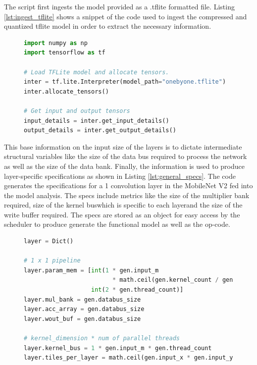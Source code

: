 \documentclass{uw-ece-wkrpt}
\begin{document}
The script first ingests the model provided as a .tflite formatted file. Listing \ref{lst:ingest_tflite} shows a snippet of the code used to ingest the compressed and quantized tflite model in order to extract the necessary information.

\begin{figure}
\centering
\begin{lstlisting}[caption={Code for ingesting a .tflite model}, label=lst:ingest_tflite, language=Python]
import numpy as np
import tensorflow as tf

# Load TFLite model and allocate tensors.
inter = tf.lite.Interpreter(model_path="onebyone.tflite")
inter.allocate_tensors()

# Get input and output tensors
input_details = inter.get_input_details()
output_details = inter.get_output_details()
\end{lstlisting}
\end{figure}

This base information on the input size of the layers is to dictate intermediate structural variables like the size of the data bus required to process the network as well as the size of the data bank. Finally, the information is used to produce layer-specific specifications as shown in Listing \ref{lst:general_specs}. The code generates the specifications for a 1  convolution layer in the MobileNet V2 fed into the model analysis. The specs include metrics like the size of the multiplier bank required, size of the \gls{kernel} bus\textemdash{}which is specific to each layer\textemdash{}and the size of the write buffer required. The specs are stored as an object for easy access by the scheduler to produce generate the functional model as well as the op-code.

\begin{figure}
\centering
\begin{lstlisting}[caption={Code for generating general specifications}, label=lst:general_specs, language=Python]
layer = Dict()

# 1 x 1 pipeline
layer.param_mem = [int(1 * gen.input_m
                         * math.ceil(gen.kernel_count / gen.thread_count)),
                   int(2 * gen.thread_count)]
layer.mul_bank = gen.databus_size
layer.acc_array = gen.databus_size
layer.wout_buf = gen.databus_size

# kernel_dimension * num of parallel threads
layer.kernel_bus = 1 * gen.input_m * gen.thread_count
layer.tiles_per_layer = math.ceil(gen.input_x * gen.input_y / gen.databus_size)
\end{lstlisting}
\end{figure}
\end{document}
